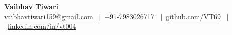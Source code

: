 \documentclass[a4paper,9pt]{extarticle}
\begin{document}
\pagestyle{empty}

\begin{center}
    \textbf{\Huge \color{accent} Vaibhav Tiwari} \\ \vspace{1pt}
    {\small \color{muted} 
    \href{mailto:vaibhavtiwari159@gmail.com}{vaibhavtiwari159@gmail.com} \ $|$\ 
    +91-7983026717 \ $|$\ 
    \href{https://github.com/VT69}{github.com/VT69} \ $|$\ 
    \href{https://linkedin.com/in/vt004}{linkedin.com/in/vt004}
    }
\end{center}
\vspace{-6pt}






\end{document}
